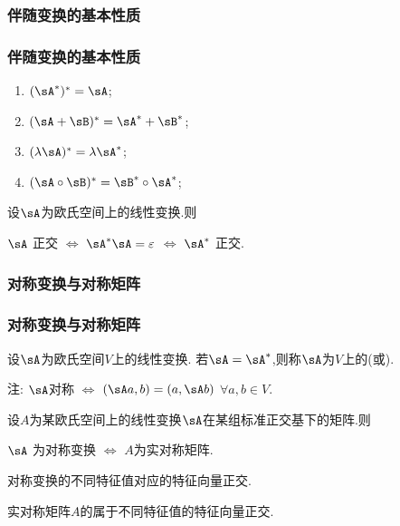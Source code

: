 \subsubsection{伴随变换的基本性质}
\begin{frame}\frametitle{伴随变换的基本性质}
\pp
\begin{proposition}
\begin{enumerate}
\item $(\sA^*)^*=\sA$;
\pp
\item $(\sA+\sB)^*=\sA^*+\sB^*$;
\pp
\item $(\lambda \sA)^* = \lambda \sA^*$;
\pp
\item $(\sA\circ\sB)^* = \sB^*\circ\sA^*$;
\end{enumerate}
\end{proposition}
\pp
\begin{proposition}
设$\sA$为欧氏空间上的线性变换.则
\begin{center}
$\sA$ 正交 \quad $\Leftrightarrow$ \quad $\sA^*\sA=\varepsilon$ \quad $\Leftrightarrow$ \quad $\sA^*$ 正交.
\end{center}
\end{proposition}
\end{frame}





\subsubsection{对称变换与对称矩阵}
\begin{frame}\frametitle{对称变换与对称矩阵}
\pp
\begin{definition}
设$\sA$为欧氏空间$V$上的线性变换.
\pp
若$\sA=\sA^*$,则称$\sA$为$V$上的(或).
\end{definition}
\pp
注: $\sA$对称 $\Leftrightarrow$ $(\sA a,b)=(a,\sA b)$ $\forall a,b\in V$.

\pp
\begin{theorem}
设$A$为某欧氏空间上的线性变换$\sA$在某组标准正交基下的矩阵.则
\begin{center}
$\sA$ 为对称变换 $\Leftrightarrow$ $A$为实对称矩阵.
\end{center}
\end{theorem}
\pp
{}

\pp
\begin{theorem}
对称变换的不同特征值对应的特征向量正交.
\end{theorem}
\pp
{}

\pp
\begin{corollary}
实对称矩阵$A$的属于不同特征值的特征向量正交.
\end{corollary}
\end{frame}


